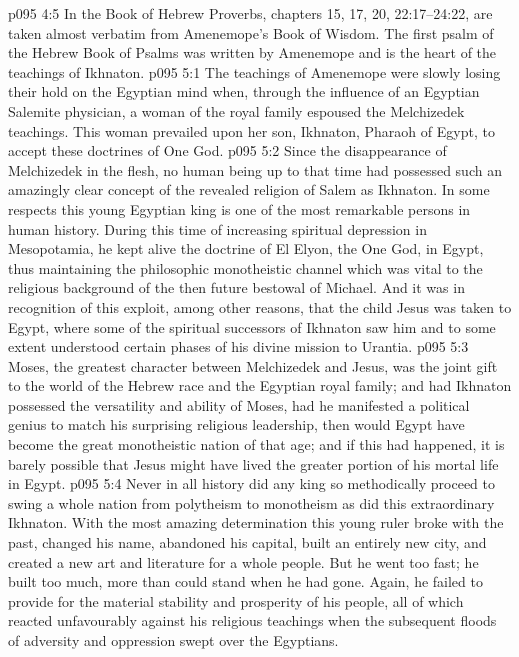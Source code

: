 \vs p095 4:5 \pc In the Book of Hebrew Proverbs, chapters 15, 17, 20, 22:17--24:22, are taken almost verbatim from Amenemope’s Book of Wisdom. The first psalm of the Hebrew Book of Psalms was written by Amenemope and is the heart of the teachings of Ikhnaton.
\vs p095 5:1 The teachings of Amenemope were slowly losing their hold on the Egyptian mind when, through the influence of an Egyptian Salemite physician, a woman of the royal family espoused the Melchizedek teachings. This woman prevailed upon her son, Ikhnaton, Pharaoh of Egypt, to accept these doctrines of One God.
\vs p095 5:2 Since the disappearance of Melchizedek in the flesh, no human being up to that time had possessed such an amazingly clear concept of the revealed religion of Salem as Ikhnaton. In some respects this young Egyptian king is one of the most remarkable persons in human history. During this time of increasing spiritual depression in Mesopotamia, he kept alive the doctrine of El Elyon, the One God, in Egypt, thus maintaining the philosophic monotheistic channel which was vital to the religious background of the then future bestowal of Michael. And it was in recognition of this exploit, among other reasons, that the child Jesus was taken to Egypt, where some of the spiritual successors of Ikhnaton saw him and to some extent understood certain phases of his divine mission to Urantia.
\vs p095 5:3 Moses, the greatest character between Melchizedek and Jesus, was the joint gift to the world of the Hebrew race and the Egyptian royal family; and had Ikhnaton possessed the versatility and ability of Moses, had he manifested a political genius to match his surprising religious leadership, then would Egypt have become the great monotheistic nation of that age; and if this had happened, it is barely possible that Jesus might have lived the greater portion of his mortal life in Egypt.
\vs p095 5:4 Never in all history did any king so methodically proceed to swing a whole nation from polytheism to monotheism as did this extraordinary Ikhnaton. With the most amazing determination this young ruler broke with the past, changed his name, abandoned his capital, built an entirely new city, and created a new art and literature for a whole people. But he went too fast; he built too much, more than could stand when he had gone. Again, he failed to provide for the material stability and prosperity of his people, all of which reacted unfavourably against his religious teachings when the subsequent floods of adversity and oppression swept over the Egyptians.
